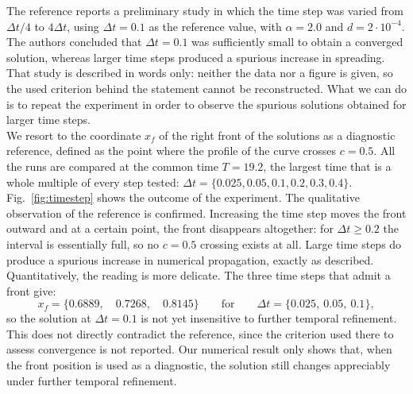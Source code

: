 \noindent
The reference reports a preliminary study in which the time step was varied from $\Delta t/4$ to $4\Delta t$, using $\Delta t = 0.1$ as the reference value, with $\alpha = 2.0$ and $d = 2\cdot10^{-4}$. The authors concluded that $\Delta t = 0.1$ was sufficiently small to obtain a converged solution, whereas larger time steps produced a spurious increase in spreading. That study is described in words only: neither the data nor a figure is given, so the used criterion behind the statement cannot be reconstructed. What we can do is to repeat the experiment in order to observe the spurious solutions obtained for larger time steps.\\
We resort to the coordinate $x_{f}$ of the right front of the solutions as a diagnostic reference, defined as the point where the profile of the curve crosses $c = 0.5$. All the runs are compared at the common time $T = 19.2$, the largest time that is a whole multiple of every step tested: $\Delta t = \{0.025, 0.05, 0.1,0.2, 0.3,0.4\}$. Fig.~\ref{fig:timestep} shows the outcome of the experiment. The qualitative observation of the reference is confirmed. Increasing the time step moves the front outward and at a certain point, the front disappears altogether: for $\Delta t \ge 0.2$ the interval is essentially full, so no $c = 0.5$ crossing exists at all. Large time steps do produce a spurious increase in numerical propagation, exactly as described.\\
Quantitatively, the reading is more delicate. The three time steps that admit a front give:
\[
x_{f} = \{0.6889, \quad 0.7268, \quad 0.8145\}
\qquad\text{for}\qquad
\Delta t = \{0.025,\ 0.05,\ 0.1\},
\]
so the solution at $\Delta t = 0.1$ is not yet insensitive to further temporal refinement. This does not directly contradict the reference, since the criterion used there to assess convergence is not reported. Our numerical result only shows that, when the front position is used as a diagnostic, the solution still changes appreciably under further temporal refinement.

